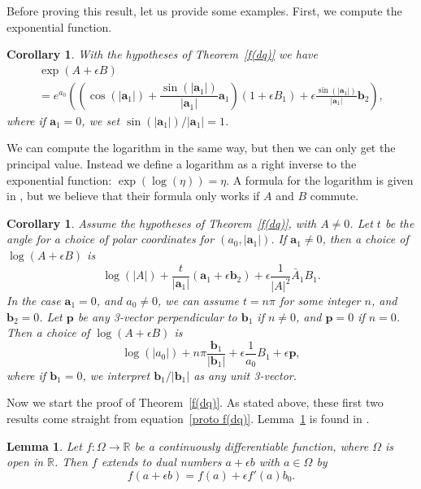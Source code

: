 \documentclass[12pt,reqno]{amsart}
\newtheorem{lemma}[theorem]{Lemma}
\newtheorem{cor}[theorem]{Corollary}
\begin{document}
Before proving this result, let us provide some examples.  First, we compute the exponential function.

\begin{cor}
\label{exp dq}
With the hypotheses of Theorem~\ref{f(dq)} we have
\label{exp theta}
\begin{multline}
\exp(A + \epsilon B ) \\
= e^{a_0} \left(\left(\cos(|\bm a_1|) + \dfrac{\sin(|\bm a_1|)}{|\bm a_1|} \bm a_1 \right) \left(1 + \epsilon B_1\right) + \epsilon\frac{\sin(|\bm a_1|)}{|\bm a_1|} \bm b_2\right),
\end{multline}
where if $\bm a_1 = 0$, we set $\sin(|\bm a_1|)/|\bm a_1| = 1$.
\end{cor}

We can compute the logarithm in the same way, but then we can only get the principal value.  Instead we define a logarithm as a right inverse to the exponential function: $\exp(\log(\eta)) = \eta$.  A formula for the logarithm is given in \cite{han-et-al}, but we believe that their formula only works if $A$ and $B$ commute.

\begin{cor}
\label{log dq}
Assume the hypotheses of Theorem~\ref{f(dq)}, with $A \ne 0$.  Let $t$ be the angle for a choice of polar coordinates for $(a_0, |\bm a_1|)$.  If $\bm a_1 \ne 0$, then a choice of $\log(A+\epsilon B)$ is
\begin{equation}
\log(|A|) + \dfrac t{|\bm a_1|} (\bm a_1 + \epsilon \bm b_2) + \epsilon \dfrac1{|A|^2} \bar A_1 B_1 .
\end{equation}
In the case $\bm a_1 = 0$, and $a_0 \ne 0$, we can assume $t = n \pi$ for some integer $n$, and $\bm b_2 = 0$.  Let $\bm p$ be any 3-vector perpendicular to $\bm b_1$ if $n \ne 0$, and $\bm p = 0$ if $n = 0$.  Then a choice of $\log(A + \epsilon B)$ is
\begin{equation}
\label{t=n pi}
\log(|a_0|) + n \pi \dfrac{\bm b_1}{|\bm b_1|} + \epsilon \dfrac 1{a_0} B_1 + \epsilon \bm p,
\end{equation}
where if $\bm b_1 = 0$, we interpret $\bm b_1 / |\bm b_1|$ as any unit 3-vector.
\end{cor}

Now we start the proof of Theorem~\ref{f(dq)}.  As stated above, these first two results come straight from equation~\eqref{proto f(dq)}.  Lemma~\ref{f(d)} is found in \cite{wiki-1}.

\begin{lemma}
\label{f(d)}
Let $f:\Omega \to \mathbb R$ be a continuously differentiable function, where $\Omega$ is open in $\mathbb R$.  Then $f$ extends to dual numbers $a + \epsilon b$ with $a \in \Omega$ by
\begin{equation}
\label{dual number case}
f(a + \epsilon b ) = f(a) + \epsilon f'(a) b_0 .
\end{equation}
\end{lemma}
\end{document}
